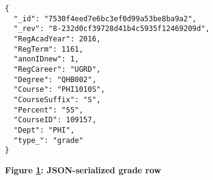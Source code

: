 \begin{figure}[H]
  \centering
  \begin{mdframed}
    \centering
    \begin{verbatim}
{
  "_id": "7530f4eed7e6bc3ef0d99a53be8ba9a2",
  "_rev": "8-232d0cf39728d41b4c5935f12469209d",
  "RegAcadYear": 2016,
  "RegTerm": 1161,
  "anonIDnew": 1,
  "RegCareer": "UGRD",
  "Degree": "QHB002",
  "Course": "PHI1010S",
  "CourseSuffix": "S",
  "Percent": "55",
  "CourseID": 109157,
  "Dept": "PHI",
  "type_": "grade"
}    
        \end{verbatim}
  \end{mdframed}
  \caption[JSON-serialized grade row]{\textbf{Figure \ref{fig-json-grade}: JSON-serialized grade row}}
  \label{fig-json-grade}
\end{figure}